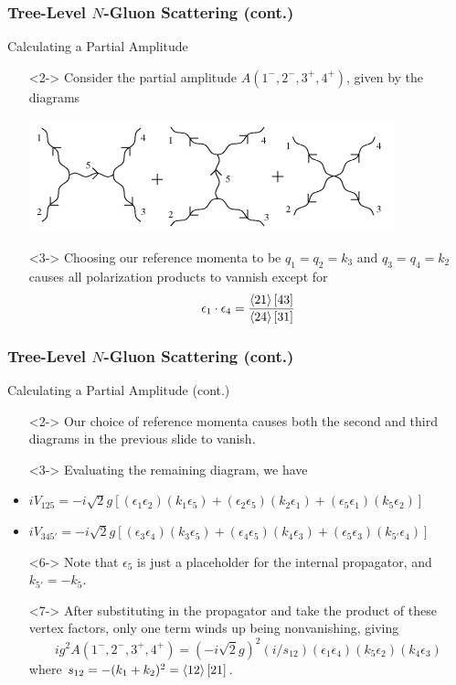 \documentclass{beamer}
\begin{document}
\begin{frame}
    \frametitle{Tree-Level $N$-Gluon Scattering (cont.)}
    \alert{Calculating a Partial Amplitude}
    \begin{itemize}
        \item[\textbullet]<2-> Consider the partial amplitude $A(1^-, 2^-, 3^+, 4^+)$, given by the diagrams
        \begin{center}
            \includegraphics[scale=0.65]{partial_amp_dia.PNG}
        \end{center}
        \item[\textbullet]<3-> Choosing our reference momenta to be $q_1 = q_2 = k_3$ and $q_3 = q_4 = k_2$ causes all polarization products to vannish except for \[ \epsilon_1\cdot\epsilon_4 = \frac{\ev{21}[43]}{\ev{24}[31]} \]
    \end{itemize}
\end{frame}

\begin{frame}
    \frametitle{Tree-Level $N$-Gluon Scattering (cont.)}
    \alert{Calculating a Partial Amplitude (cont.)}
    \begin{itemize}
        \item[\textbullet]<2-> Our choice of reference momenta causes both the second and third diagrams in the previous slide to vanish.
        \item[\textbullet]<3-> Evaluating the remaining diagram, we have
        \item<4-> $ iV_{125} = -i\sqrt{2}g\left[(\epsilon_1\epsilon_2)(k_1\epsilon_5) + (\epsilon_2\epsilon_5)(k_2\epsilon_1) + (\epsilon_5\epsilon_1)(k_5\epsilon_2)\right] $
        \item<5-> $ iV_{345'} = -i\sqrt{2}g\left[(\epsilon_3\epsilon_4)(k_3\epsilon_5) + (\epsilon_4\epsilon_5)(k_4\epsilon_3) + (\epsilon_5\epsilon_3)(k_{5'}\epsilon_4)\right] $
        \item[\textbullet]<6-> Note that $\epsilon_5$ is just a placeholder for the internal propagator, and $k_{5'} = -k_5$.
        \item[\textbullet]<7-> After substituting in the propagator and take the product of these vertex factors, only one term winds up being nonvanishing, giving \[ ig^2A(1^-,2^-,3^+,4^+) = (-i\sqrt{2}g)^2(i/s_{12})(\epsilon_1\epsilon_4)(k_5\epsilon_2)(k_4\epsilon_3) \] where $s_{12} = -(k_1 + k_2)^2 = \ev{12}[21]$.
    \end{itemize}
\end{frame}
\end{document}
